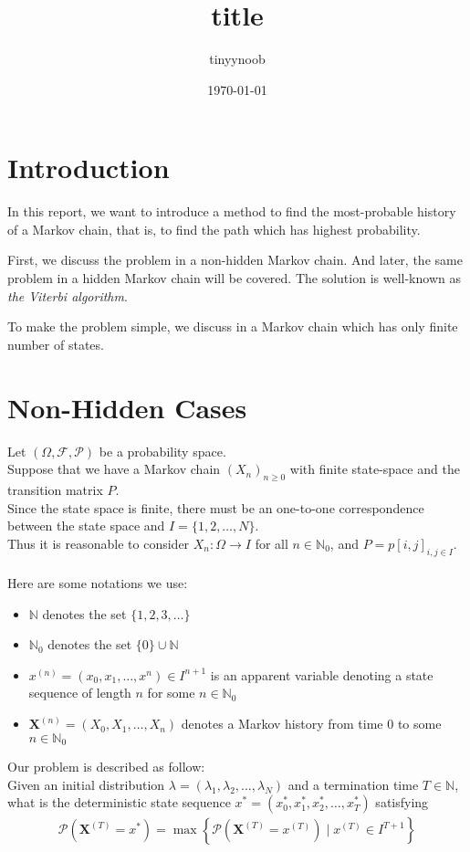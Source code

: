 \documentclass{article}
\title{title}
\author{tinyynoob}
\date{\today}
\begin{document}
\section{Introduction}

In this report, we want to introduce a method to find the most-probable history of a Markov chain, 
that is, to find the path which has highest probability.

First, we discuss the problem in a non-hidden Markov chain. 
And later, the same problem in a hidden Markov chain will be covered. 
The solution is well-known as {\it the Viterbi algorithm}.

To make the problem simple, we discuss in a Markov chain which has only finite number of states.


\section{Non-Hidden Cases} \setlength{\parindent}{0cm}

Let $(\Omega,\mathcal{F},\mathcal{P})$ be a probability space. \\
Suppose that we have a Markov chain $(X_n)_{n\geq 0}$ with finite state-space and the transition matrix $P$. \\
Since the state space is finite, there must be an one-to-one correspondence between the state space and $I=\{1,2,\dotsc,N\}$. \\
Thus it is reasonable to consider $X_n:\Omega\to I$ for all $n\in\mathbb{N}_0$, and $P=p[i,j]_{i,j\in I}$. \\
\\
Here are some notations we use:
\begin{itemize}
    \item $\mathbb{N}$ denotes the set $\{1,2,3,\dotsc\}$
    \item $\mathbb{N}_0$ denotes the set $\{0\}\cup\mathbb{N}$
    \item $x^{(n)}=(x_0,x_1,\dotsc,x^{n})\in I^{n+1}$ is an apparent variable denoting a state sequence of length $n$ for some $n\in\mathbb{N}_0$
    \item $\mathbf{X}^{(n)}=(X_0,X_1,\dotsc,X_n)$ denotes a Markov history from time $0$ to some $n\in\mathbb{N}_0$
\end{itemize}
$ $\\
Our problem is described as follow: \\
Given an initial distribution $\lambda=(\lambda_1,\lambda_2,\dotsc,\lambda_N)$ and a termination time $T\in\mathbb{N}$, 
what is the deterministic state sequence $x^*=(x^*_0,x^*_1,x^*_2,\dotsc,x^*_T)$ satisfying
\begin{align}\label{eq:1}
    \mathcal{P}(\mathbf{X}^{(T)}=x^*) = \max \left\{\mathcal{P}(\mathbf{X}^{(T)}=x^{(T)})\mid x^{(T)}\in I^{T+1}\right\}
\end{align}
\end{document}
